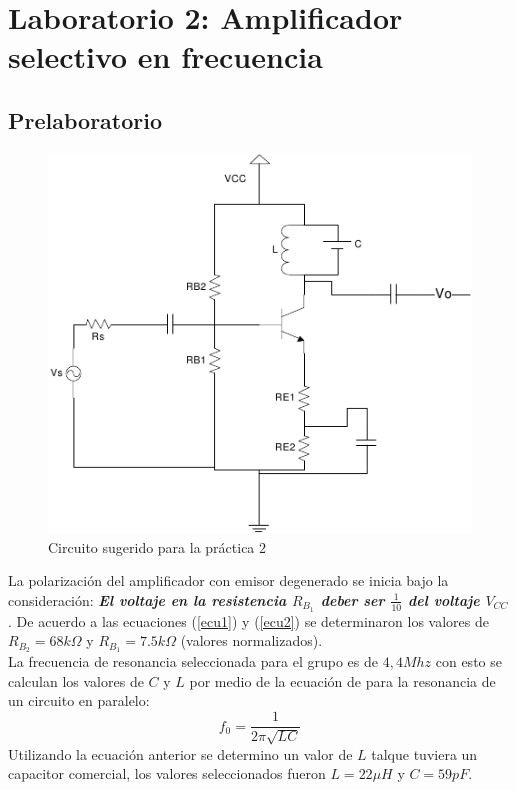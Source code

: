 \documentclass[11pt,graphicx,caption,rotating]{article}
\begin{document}
\section{Laboratorio 2: Amplificador selectivo en frecuencia}

\subsection{Prelaboratorio}
\noindent
\begin{figure}[H]
	\centering
		\includegraphics[scale=0.5]{circuit_lab_2.png}
	\caption{Circuito sugerido para la práctica $2$}
	\label{fig8}
\end{figure}
\noindent
La polarización del amplificador con emisor degenerado se inicia bajo la consideración: \textbf{\textit{El voltaje en la resistencia $R_{B_{1}}$ deber ser $\frac{1}{10}$ del voltaje $V_{CC}$}}. De acuerdo a las ecuaciones (\ref{ecu1}) y (\ref{ecu2}) se determinaron los valores de $R_{B_2} = 68 k\Omega$ y $R_{B_1} = 7.5 k\Omega$ (valores normalizados).\\
La frecuencia de resonancia seleccionada para el grupo es de $4,4 Mhz$ con esto se calculan los valores de $C$ y $L$ por medio de la ecuación de para la resonancia de un circuito en paralelo:
\begin{equation}
 f_0=\frac{1}{2 \pi \sqrt{L C}}
\label{ecu11}
\end{equation}
\noindent
Utilizando la ecuación anterior se determino un valor de $L$ talque tuviera un capacitor comercial, los valores seleccionados fueron $L=22 \mu H$ y $C=59 pF$.\\
\end{document}
